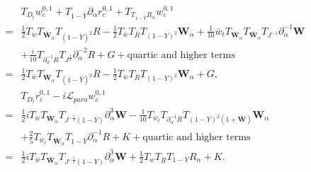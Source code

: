 \documentclass[10pt]{amsart}
\theoremstyle{remark}
\theoremstyle{definition}
\numberwithin{equation}{section}
\newcommand{\p}{\partial}
\newcommand{\al}{\alpha}
\newcommand{\f}{\frac}
\newcommand{\bw}{\mathbf{W}}
\begin{document}
\begin{align*} 
&T_{D_t}w^{0,1}_c+T_{1-\bar{Y}}\p_\al r^{0,1}_c+T_{T_{1-\bar{Y}}R_{\al}}w^{0,1}_c\\
=& \f12 T_{\bar{w}}T_{\bar{\bw}_\al}T_{(1-\bar{Y})^2}R -\f12  T_{\bar{w}}T_{\bar{R}} T_{(1-Y)^2}\bw_\al+\f1{10}\bar{w}_tT_{\bar{\bw}_{\al}}T_{\bar{\bw}_{\al}}T_{J^{-1}}\p^{-1}_{\al}\bw\\
&+\f{i}{10} T_{\p^{-1}_{\al}\bar{R}}  T_{J^{\frac{3}{2}}}  \p_\al^{-2}R + G + \text{quartic and higher terms}\\
=& \f12 T_{\bar{w}}T_{\bar{\bw}_\al}T_{(1-\bar{Y})^2}R -\f12  T_{\bar{w}}T_{\bar{R}} T_{(1-Y)^2}\bw_\al + G,\\
&T_{D_t}r^{0,1}_c-i\mathcal{L}_{para}w^{0,1}_c \\
=&\f12iT_{\bar{w}}T_{\bar{\bw}_\al} T_{J^{-\f52}(1-Y)}  \p_\al^3 \bw-\f1{10} T_{\bar{w}_t}T_{\p^{-1}_{\al}\bar{R}}T_{(1-Y)^2(1+\bar{\bw})}\bw_{\al}\\
&+\f25 T_{\bar{w}_t}T_{\bar{\bw}_{\al}}T_{1-\bar{Y}}  \p^{-1}_{\al}R+K+ \text{quartic and higher terms}\\
=& \f12iT_{\bar{w}}T_{\bar{\bw}_\al} T_{J^{-\f52}(1-Y)}  \p_\al^3 \bw  + \f12  T_wT_{\bar{R}} T_{1-Y}R_\al + K.
\end{align*}
\end{document}
